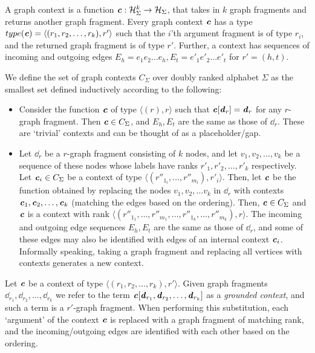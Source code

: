 \documentclass[11pt]{article}
\begin{document}
\begin{definition}\label{def:graphcontext}

  A graph context is a function $\boldsymbol{\mathit{c}}: \mathcal{H}_\Sigma^k \rightarrow \mathcal{H}_\Sigma$,
  that takes in $k$ graph fragments and returns another graph fragment. Every
  graph context $\boldsymbol{\mathit{c}}$ has a type $ type(\boldsymbol{\mathit{c}}) = \langle (r_1,r_2,\ldots,r_k), r'
  \rangle$ such that the $i$'th argument fragment is of type $r_i$, and the
  returned graph fragment is of type $r'$. Further, a context has sequences of
  incoming and outgoing edges $E_h = e_1e_2\ldots e_h, E_t = e'_1e'_2\ldots
  e'_t$ for $r' = (h,t)$. 

  We define the set of graph contexts $C_\Sigma$ over doubly ranked alphabet
  $\Sigma$ as the smallest set defined inductively according to the following:

  \begin{itemize}
    \item Consider the function $\boldsymbol{\mathit{c}}$ of type $\langle (r),r\rangle$ such that
    $\boldsymbol{\mathit{c}}[\boldsymbol{\mathit{d}}_r] = \boldsymbol{\mathit{d}}_r$ for any $r$-graph fragment. Then $\boldsymbol{\mathit{c}} \in C_\Sigma$,
    and $E_h,E_t$ are the same as those of $\dd_r$. These are `trivial' contexts
    and can be thought of as a placeholder/gap.

    \item Let $\dd_r$ be a $r$-graph fragment consisting of $k$ nodes, and let
    $v_1,v_2,\ldots, v_k$ be a sequence of these nodes whose labels have ranks
    $r'_1, r'_2,\ldots, r'_k$ respectively. Let $\boldsymbol{\mathit{c}}_i \in C_\Sigma$ be a
    context of type $\langle (r''_{1_i},\ldots,r''_{m_i}), r'_i\rangle$. Then,
    let $\boldsymbol{\mathit{c}}$ be the function obtained by replacing the nodes $v_1,v_2,\ldots
    v_k$ in $\dd_r$ with contexts $\boldsymbol{\mathit{c}}_1, \boldsymbol{\mathit{c}}_2,\ldots,\boldsymbol{\mathit{c}}_k$ (matching the
    edges based on the ordering). Then, $\boldsymbol{\mathit{c}} \in C_\Sigma$ and $\boldsymbol{\mathit{c}}$ is a
    context with rank $\langle
    (r''_{1_1},\ldots,r''_{m_1},\ldots,r''_{1_k},\ldots,r''_{m_k}),r\rangle$.
    The incoming and outgoing edge sequences $E_h, E_t$ are the same as those of
    $\dd_r$, and some of these edges may also be identified with edges of an
    internal context $\boldsymbol{\mathit{c}}_i$. Informally speaking, taking a graph fragment and
    replacing all vertices with contexts generates a new context. 
  \end{itemize}

  Let $\boldsymbol{\mathit{c}}$ be a context of type $\langle (r_1,r_2,\ldots,r_k), r' \rangle$.
  Given graph fragments $\dd_{r_1}, \dd_{r_2}, \ldots, \dd_{r_k}$ we refer to
  the term $\boldsymbol{\mathit{c}}[\boldsymbol{\mathit{d}}_{r_1}, \boldsymbol{\mathit{d}}_{r_2}, \ldots, \boldsymbol{\mathit{d}}_{r_k}]$ as a \emph{grounded
  context}, and such a term is a $r'$-graph fragment. When performing this
  substitution, each `argument' of the context $\boldsymbol{\mathit{c}}$ is replaced with a graph
  fragment of matching rank, and the incoming/outgoing edges are identified with
  each other based on the ordering. 

\end{definition}
\end{document}
